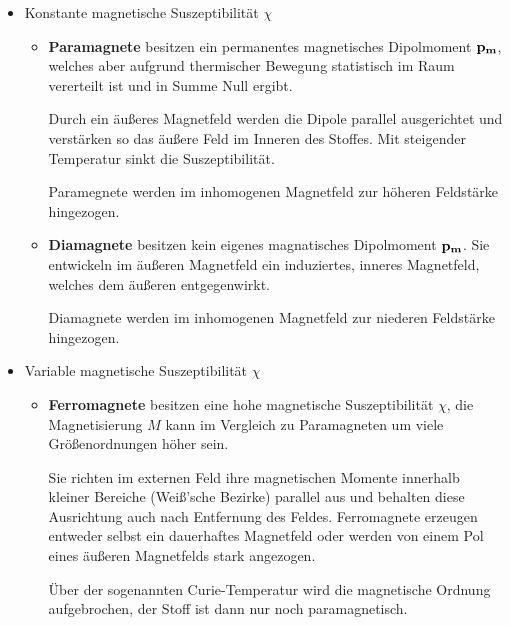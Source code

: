 \documentclass[a4paper, 11pt, parskip=half]{scrartcl}
\begin{document}
\begin{itemize}
    \item Konstante magnetische Suszeptibilität $\chi$
    
        \begin{itemize}
            \item \textbf{Paramagnete} besitzen ein permanentes magnetisches Dipolmoment
                $\bold{p_m}$, welches aber aufgrund thermischer Bewegung statistisch im Raum 
                vererteilt ist und in Summe Null ergibt.
                
                Durch ein äußeres Magnetfeld werden die Dipole parallel ausgerichtet und verstärken
                so das äußere Feld im Inneren des Stoffes. Mit steigender Temperatur sinkt die
                Suszeptibilität.
                
                Paramegnete werden im inhomogenen Magnetfeld zur höheren Feldstärke hingezogen.
                
            \item \textbf{Diamagnete} besitzen kein eigenes magnatisches Dipolmoment $\bold{p_m}$.
                Sie entwickeln im  äußeren Magnetfeld ein induziertes, inneres Magnetfeld, welches
                dem äußeren entgegenwirkt.
                
                Diamagnete werden im inhomogenen Magnetfeld zur niederen Feldstärke hingezogen.
        \end{itemize}
    
    \item Variable magnetische Suszeptibilität $\chi$
        
        \begin{itemize}
            \item \textbf{Ferromagnete} besitzen eine hohe magnetische Suszeptibilität $\chi$, die
                Magnetisierung $M$ kann im Vergleich zu Paramagneten um viele Größenordnungen höher
                sein.
                
                Sie richten im externen Feld ihre magnetischen Momente innerhalb kleiner Bereiche
                (Weiß'sche Bezirke) parallel aus und behalten diese Ausrichtung auch nach Entfernung
                des Feldes. Ferromagnete erzeugen entweder selbst ein dauerhaftes Magnetfeld oder
                werden von einem Pol eines äußeren Magnetfelds stark angezogen.
                
                Über der sogenannten Curie-Temperatur wird die magnetische Ordnung aufgebrochen,
                der Stoff ist dann nur noch paramagnetisch.
                

\end{itemize}
\end{itemize}
\end{document}

